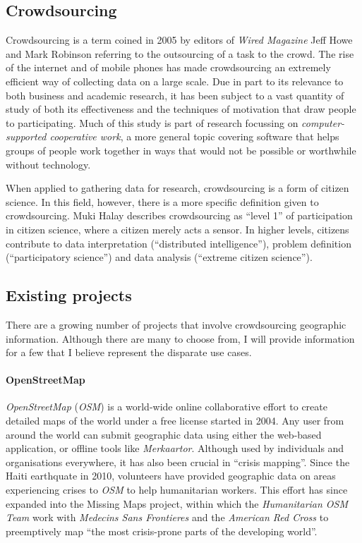 \documentclass{article}
\begin{document}
		\subsection{Crowdsourcing}
		Crowdsourcing is a term coined in 2005 by editors of \textit{Wired Magazine} Jeff Howe and Mark Robinson\cite{safire_fat_2009} referring to the outsourcing of a task to the crowd. The rise of the internet and of mobile phones has made crowdsourcing an extremely efficient way of collecting data on a large scale. Due in part to its relevance to both business and academic research, it has been subject to a vast quantity of study of both its effectiveness\cite{brabham_effectiveness_2010} and the techniques of motivation that draw people to participating\cite{hossain_users_2012}. Much of this study is part of research focussing on \textit{computer-supported cooperative work}, a more general topic covering software that helps groups of people work together in ways that would not be possible or worthwhile without technology.

		When applied to gathering data for research, crowdsourcing is a form of citizen science\cite{_citizen_2015}. In this field, however, there is a more specific definition given to crowdsourcing. Muki Halay describes crowdsourcing as ``level 1'' of participation in citizen science, where a citizen merely acts a sensor. In higher levels, citizens contribute to data interpretation (``distributed intelligence''), problem definition (``participatory science'') and data analysis (``extreme citizen science'')\cite{haklay_citizen_2013}.

		\subsection{Existing projects}
		There are a growing number of projects that involve crowdsourcing geographic information. Although there are many to choose from, I will provide information for a few that I believe represent the disparate use cases.

		\paragraph{OpenStreetMap}
		\textit{OpenStreetMap} (\textit{OSM}) is a world-wide online collaborative effort to create detailed maps of the world under a free\cite{_open_2012} license started in 2004. Any user from around the world can submit geographic data using either the web-based application, or offline tools like \textit{Merkaartor}. Although used by individuals and organisations everywhere, it has also been crucial in ``crisis mapping''. Since the Haiti earthquate in 2010, volunteers have provided geographic data on areas experiencing crises to \textit{OSM} to help humanitarian workers\cite{_our_????}. This effort has since expanded into the Missing Maps project, within which the \textit{Humanitarian OSM Team} work with \textit{Medecins Sans Frontieres} and the \textit{American Red Cross} to preemptively map ``the most crisis-prone parts of the developing world''\cite{_missing_????}.
\end{document}
